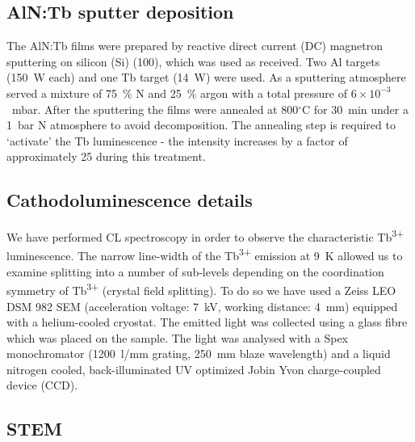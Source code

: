 \documentclass[%
aip,
rsi,%
 amsmath,amssymb,%
 reprint,%
]{revtex4-1}
\begin{document}
\subsection{AlN:Tb sputter deposition}
\label{sec:growth}

The AlN:Tb films were prepared by reactive direct current (DC) magnetron sputtering on silicon (Si) (100), which was used as received. Two Al targets (150~W each) and one Tb target (14~W) were used. As a sputtering atmosphere served a mixture of 75~\% N and 25~\% argon with a total pressure of $6 \times 10^{-3}$~mbar. After the sputtering the films were annealed at 800$^\circ$C for 30~min under a 1~bar N atmosphere to avoid decomposition. The annealing step is required to \lq{activate}\rq{} the Tb luminescence - the intensity increases by a factor of approximately 25 during this treatment.

\subsection{Cathodoluminescence details}
\label{sec:CL}

We have performed CL spectroscopy in order to observe the characteristic Tb\textsuperscript{3+} luminescence. The narrow line-width of the Tb\textsuperscript{3+} emission at 9~K allowed us to examine splitting into a number of sub-levels depending on the coordination symmetry of Tb\textsuperscript{3+} (crystal field splitting). To do so we have used a Zeiss LEO DSM 982 SEM \cite{Schirra2007} (acceleration voltage: 7~kV,  working distance: 4~mm) equipped with a helium-cooled cryostat. The emitted light was collected using a glass fibre which was placed on the sample. The light was analysed with a Spex monochromator (1200~l/mm grating, 250~mm blaze wavelength) and a liquid nitrogen cooled, back-illuminated UV optimized Jobin Yvon charge-coupled device (CCD).

\subsection{STEM}
\label{sec:STEM}
\end{document}
